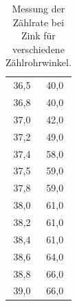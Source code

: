 \begin{table}[H]
\begin{minipage}[c]{0.5\textwidth}
\begin{tabular}{c|c}
      36,5	& 40,0 \\
      36,8	& 40,0 \\
      37,0	& 42,0 \\
      37,2	& 49,0 \\
      37,4	& 58,0 \\
      37,5	& 59,0 \\
      37,8	& 59,0 \\
      38,0	& 61,0 \\
      38,2	& 61,0 \\
      38,4	& 61,0 \\
      38,6	& 64,0 \\
      38,8	& 66,0 \\
      39,0	& 66,0
    \end{tabular}
    \captionsetup{width=7cm}
    \caption{Messung der Zählrate bei Zink für verschiedene Zählrohrwinkel.}
  \end{minipage}
\end{table}

